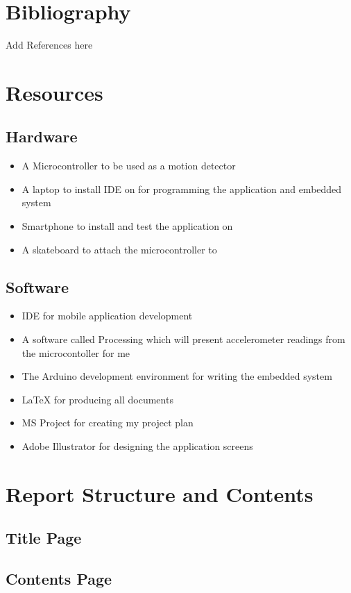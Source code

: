 \section{Bibliography}\label{tor:bibliography}
Add References here

\section{Resources}\label{tor:resources}
\subsection{Hardware}\label{tor:hardware}
\begin{itemize}
\item A Microcontroller to be used as a motion detector
\item A laptop to install IDE on for programming the application and embedded system
\item Smartphone to install and test the application on
\item A skateboard to attach the microcontroller to
\end{itemize}
\subsection{Software}\label{tor:software}
\begin{itemize}
\item IDE for mobile application development
\item A software called Processing which will present accelerometer readings from the microcontoller for me
\item The Arduino development environment for writing the embedded system
\item LaTeX for producing all documents
\item MS Project for creating my project plan
\item Adobe Illustrator for designing the application screens
\end{itemize}

\section{Report Structure and Contents}\label{tor:reportstruct}
\subsection{Title Page}\label{tor:rpttitlepage}
\subsection{Contents Page}\label{tor:rptcontentspage}

